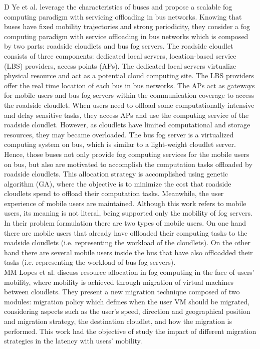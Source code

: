 D Ye et al. \cite{ye2016scalable} leverage the characteristics of buses and propose a scalable fog computing paradigm with servicing offloading in bus networks. Knowing that buses have fixed mobility trajectories and strong periodicity, they consider a fog computing paradigm with service offloading in bus networks which is composed by two parts: roadside cloudlets and bus fog servers. The roadside cloudlet consists of three components: dedicated local servers, location-based service (LBS) providers, access points (APs). The dedicated local servers virtualize physical resource and act as a potential cloud computing site. The LBS providers offer the real time location of each bus in bus networks. The APs act as gateways for mobile users and bus fog servers within the communication coverage to access the roadside cloudlet. When users need to offload some computationally intensive and delay sensitive tasks, they access APs and use the computing service of the roadside cloudlet. However, as cloudlets have limited computational and storage resources, they may became overloaded. The bus fog server is a virtualized computing system on bus, which is similar to a light-weight cloudlet server. Hence, those buses not only provide fog computing services for the mobile users on bus, but also are motivated to accomplish the computation tasks offloaded by roadside cloudlets. This allocation strategy is accomplished using genetic algorithm (GA), where the objective is to minimize the cost that roadside cloudlets spend to offload their computation tasks. Meanwhile, the user experience of mobile users are maintained. Although this work refers to mobile users, its meaning is not literal, being supported only the mobility of fog servers. In their problem formulation there are two types of mobile users. On one hand there are mobile users that already have offloaded their computing tasks to the roadside cloudlets (i.e. representing the workload of the cloudlets). On the other hand there are several mobile users inside the bus that have also offloadded their tasks (i.e. representing the workload of bus fog servers).\\
MM Lopes et al. \cite{lopes2017myifogsim} discuss resource allocation in fog computing in the face of users’ mobility, where mobility is achieved through migration of virtual machines between cloudlets. They present a new migration technique composed of two modules: migration policy which defines when the user VM should be migrated, considering aspects such as the user's speed, direction and geographical position and migration strategy, the destination cloudlet, and how the migration is performed. This work had the objective of study the impact of different migration strategies in the latency with users’ mobility.

